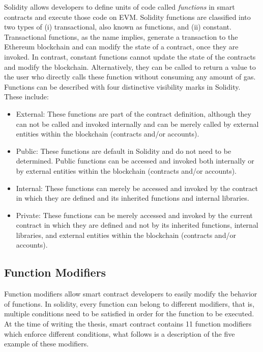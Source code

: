 Solidity allows developers to define units of code called \emph{functions} in smart contracts and execute those code on EVM. Solidity functions are classified into two types of (i) transactional, also known as functions, and (ii) constant. Transactional functions, as the name implies, generate a transaction to the Ethereum blockchain and can modify the state of a contract, once they are invoked. In contrast, constant functions cannot update the state of the contracts and modify the blockchain. Alternatively, they can be called to return a value to the user who directly calls these function without consuming any amount of gas. Functions can be described with four distinctive visibility marks in Solidity. These include: 
\begin{itemize}
\item External: These functions are part of the contract definition, although they can not be called and invoked internally and can be merely called by external entities within the blockchain (contracts and/or accounts).
\item Public: These functions are default in Solidity and do not need to be determined. Public functions can be accessed and invoked both internally or by external entities within the blockchain (contracts and/or accounts).
\item Internal: These functions can merely be accessed and invoked by the contract in which they are defined and its inherited functions and internal libraries.
\item Private: These functions can be merely accessed and invoked by the current contract in which they are defined and not by its inherited functions, internal libraries, and external entities within the blockchain (contracts and/or accounts).
\end{itemize}
\subsection{Function Modifiers}

Function modifiers allow smart contract developers to easily modify the behavior of functions. In solidity, every function can belong to different modifiers, that is, multiple conditions need to be satisfied in order for the function to be executed. At the time of writing the thesis, \Ghazalstar smart contract contains 11 function modifiers which enforce different conditions, what follows is a description of the five example of these modifiers.
